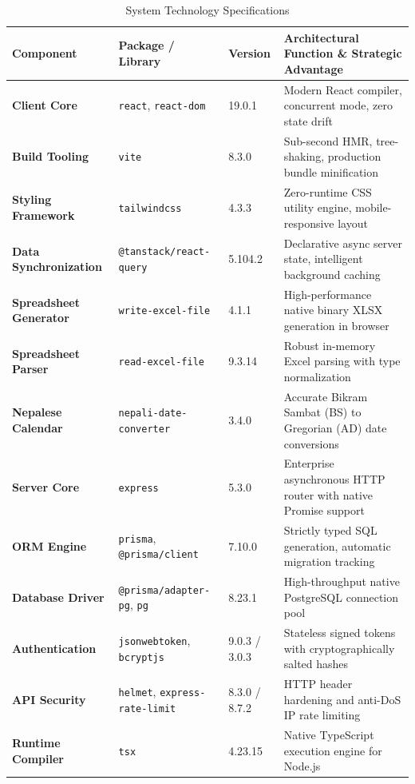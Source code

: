 \documentclass[10pt,a4paper]{article}
\begin{document}
\begin{table}[h!]
\centering
\small
\begin{tabularx}{\textwidth}{>{\bfseries\color{NavyDark}}p{3.2cm}p{3.2cm}p{2.0cm}X}
\toprule
\rowcolor{NavyDark}
\color{white}Component & \color{white}Package / Library & \color{white}Version & \color{white}Architectural Function \& Strategic Advantage \\
\midrule
Client Core & \texttt{react}, \texttt{react-dom} & 19.0.1 & Modern React compiler, concurrent mode, zero state drift \\
\rowcolor{SlateLight}
Build Tooling & \texttt{vite} & 8.3.0 & Sub-second HMR, tree-shaking, production bundle minification \\
Styling Framework & \texttt{tailwindcss} & 4.3.3 & Zero-runtime CSS utility engine, mobile-responsive layout \\
\rowcolor{SlateLight}
Data Synchronization & \texttt{@tanstack/react-query} & 5.104.2 & Declarative async server state, intelligent background caching \\
Spreadsheet Generator & \texttt{write-excel-file} & 4.1.1 & High-performance native binary XLSX generation in browser \\
\rowcolor{SlateLight}
Spreadsheet Parser & \texttt{read-excel-file} & 9.3.14 & Robust in-memory Excel parsing with type normalization \\
Nepalese Calendar & \texttt{nepali-date-converter} & 3.4.0 & Accurate Bikram Sambat (BS) to Gregorian (AD) date conversions \\
\rowcolor{SlateLight}
Server Core & \texttt{express} & 5.3.0 & Enterprise asynchronous HTTP router with native Promise support \\
ORM Engine & \texttt{prisma}, \texttt{@prisma/client} & 7.10.0 & Strictly typed SQL generation, automatic migration tracking \\
\rowcolor{SlateLight}
Database Driver & \texttt{@prisma/adapter-pg}, \texttt{pg} & 8.23.1 & High-throughput native PostgreSQL connection pool \\
Authentication & \texttt{jsonwebtoken}, \texttt{bcryptjs} & 9.0.3 / 3.0.3 & Stateless signed tokens with cryptographically salted hashes \\
\rowcolor{SlateLight}
API Security & \texttt{helmet}, \texttt{express-rate-limit} & 8.3.0 / 8.7.2 & HTTP header hardening and anti-DoS IP rate limiting \\
Runtime Compiler & \texttt{tsx} & 4.23.15 & Native TypeScript execution engine for Node.js \\
\bottomrule
\end{tabularx}
\caption{System Technology Specifications}
\end{table}
\end{document}
